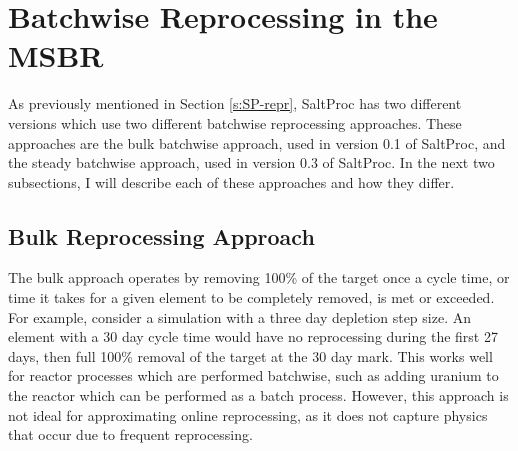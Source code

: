\section{Batchwise Reprocessing in the MSBR}
\label{s:batch-generic}

As previously mentioned in Section \ref{s:SP-repr}, SaltProc has two different versions which use two different batchwise reprocessing approaches.
These approaches are the bulk batchwise approach, used in version 0.1 of SaltProc, and the steady batchwise approach, used in version 0.3 of SaltProc. In the next two subsections, I will describe each of these approaches and how they differ.


\subsection{Bulk Reprocessing Approach}


The bulk approach operates by removing 100\% of the target once a cycle time, or time it takes for a given element to be completely removed, is met or exceeded.
For example, consider a simulation with a three day depletion step size. An element with a 30 day cycle time would have no reprocessing during the first 27 days, then full 100\% removal of the target at the 30 day mark. This works well for reactor processes which are performed batchwise, such as adding uranium to the reactor which can be performed as a batch process. However, this approach is not ideal for approximating online reprocessing, as it does not capture physics that occur due to frequent reprocessing.

